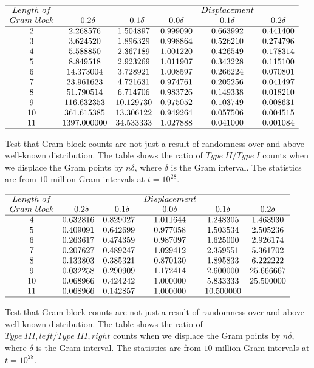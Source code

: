 \documentclass[twoside]{article}
\begin{document}
\begin{table}
\centering \(\begin{array}{cccccc}
\hline
Length~of 	& &&&Displacement \\
Gram~block	& -0.2\delta & -0.1\delta & 0.0\delta & 0.1\delta & 0.2\delta  \\
\hline
2 &2.268576&1.504897&0.999090&0.663992&0.441400 \\
3 &3.624520&1.896329&0.998864&0.526210&0.274796 \\
4 &5.588850&2.367189&1.001220&0.426549&0.178314 \\
5 &8.849518&2.923269&1.011907&0.343228&0.115100 \\
6 &14.373004&3.728921&1.008597&0.266224&0.070801 \\
7 &23.961623&4.721631&0.974761&0.205256&0.041497 \\
8 &51.790514&6.714706&0.983726&0.149338&0.018210 \\
9 &116.632353&10.129730&0.975052&0.103749&0.008631 \\
10 &361.615385&13.306122&0.949264&0.057506&0.004515 \\
11 &1397.000000&34.533333&1.027888&0.041000&0.001084 \\
\hline
\end{array}\)
\caption{Test that Gram block counts are not just a result of randomness over and above well-known distribution. The table shows the ratio of $Type~II/Type~I$ counts when we displace the Gram points by $n\delta$, where $\delta$ is the Gram interval. The statistics are from $10$ million Gram intervals at $t=10^{28}$.} \label{tab:rosserrandom}
\end{table}

\begin{table}
\centering \(\begin{array}{cccccc}
\hline
Length~of 	& &&Displacement \\
Gram~block	& -0.2\delta & -0.1\delta & 0.0\delta & 0.1\delta & 0.2\delta  \\
\hline
4 &0.632816&0.829027&1.011644&1.248305&1.463930 \\
5 &0.409091&0.642699&0.977058&1.503534&2.505236 \\
6 &0.263617&0.474359&0.987097&1.625000&2.926174 \\
7 &0.207627&0.489247&1.029412&2.359551&5.361702 \\
8 &0.133803&0.385321&0.870130&1.895833&6.222222 \\
9 &0.032258&0.290909&1.172414&2.600000&25.666667 \\
10 &0.068966&0.424242&1.000000&5.833333&25.500000 \\
11 &0.068966&0.142857&1.000000&10.500000& \\
\hline
\end{array}\)
\caption{Test that Gram block counts are not just a result of randomness over and above well-known distribution. The table shows the ratio of $Type~III,left/Type~III,right$ counts when we displace the Gram points by $n\delta$, where $\delta$ is the Gram interval. The statistics are from $10$ million Gram intervals at $t=10^{28}$.} \label{tab:rosser3random}
\end{table}
\end{document}
